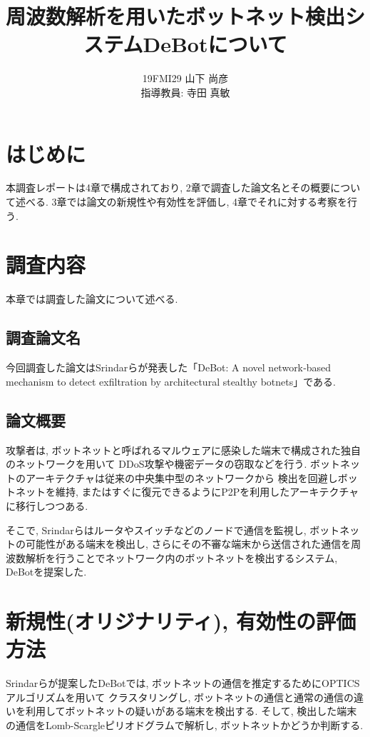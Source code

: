 \documentclass[twocolumn,9]{ltjsarticle}
\title{周波数解析を用いたボットネット検出システムDeBotについて}
\author{19FMI29 山下 尚彦 \\ 指導教員: 寺田 真敏}
\date{}
\begin{document}
\maketitle

\section{はじめに}
本調査レポートは4章で構成されており, 2章で調査した論文名とその概要について述べる. 
3章では論文の新規性や有効性を評価し, 4章でそれに対する考察を行う. 

\section{調査内容}
本章では調査した論文について述べる. 

\subsection{調査論文名}
今回調査した論文はSrindarらが発表した「DeBot: A novel network‐based mechanism to detect exfiltration 
by architectural stealthy botnets」\cite{venkatesan2018debot}である. 

\subsection{論文概要}
攻撃者は, ボットネットと呼ばれるマルウェアに感染した端末で構成された独自のネットワークを用いて
DDoS攻撃や機密データの窃取などを行う. ボットネットのアーキテクチャは従来の中央集中型のネットワークから
検出を回避しボットネットを維持, またはすぐに復元できるようにP2Pを利用したアーキテクチャに移行しつつある. 

そこで, Srindarらはルータやスイッチなどのノードで通信を監視し, ボットネットの可能性がある端末を検出し, 
さらにその不審な端末から送信された通信を周波数解析を行うことでネットワーク内のボットネットを検出するシステム, 
DeBotを提案した. 

\section{新規性(オリジナリティ), 有効性の評価方法}
Srindarらが提案したDeBotでは, ボットネットの通信を推定するためにOPTICSアルゴリズム\cite{ankerst1999optics}を用いて
クラスタリングし, ボットネットの通信と通常の通信の違いを利用してボットネットの疑いがある端末を検出する. 
そして, 検出した端末の通信をLomb-Scargleピリオドグラム\cite{vanderplas2018understanding}で解析し, 
ボットネットかどうか判断する. 
\end{document}
